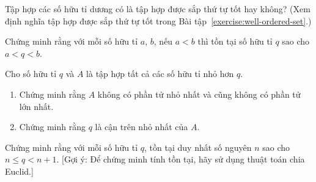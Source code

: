 \begin{exercise}
    Tập hợp các số hữu tỉ dương có là tập hợp được sắp thứ tự tốt hay không? (Xem định nghĩa tập hợp được sắp thứ tự tốt trong Bài tập~\ref{exercise:well-ordered-set}.)
\end{exercise}

\begin{exercise}
    Chứng minh rằng với mỗi số hữu tỉ $a$, $b$, nếu $a < b$ thì tồn tại số hữu tỉ $q$ sao cho $a < q < b$.
\end{exercise}

\begin{exercise}
    Cho số hữu tỉ $q$ và $A$ là tập hợp tất cả các số hữu tỉ nhỏ hơn $q$.
    \begin{enumerate}[label={(\roman*)}]
        \item Chứng minh rằng $A$ không có phần tử nhỏ nhất và cũng không có phần tử lớn nhất.
        \item Chứng minh rằng $q$ là cận trên nhỏ nhất của $A$.
    \end{enumerate}
\end{exercise}

\begin{exercise}
    Chứng minh rằng với mỗi số hữu tỉ $q$, tồn tại duy nhất số nguyên $n$ sao cho $n\leq q < n + 1$. [Gợi ý: Để chứng minh tính tồn tại, hãy sử dụng thuật toán chia Euclid.]
\end{exercise}
